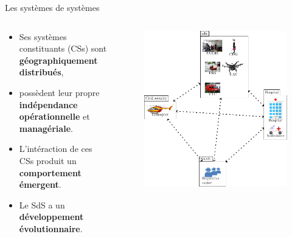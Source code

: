 

\begin{frame}{Les systèmes de systèmes}
\centering 
\begin{columns}
\begin{column}{0.4\textwidth}
\begin{block}{}
\begin{itemize}
\item  Ses systèmes constituants (CSs) sont \textbf{géographiquement
distribués}, 
\item possèdent leur propre \textbf{indépendance
opérationnelle} et
\textbf{managériale}. 
\item L'intéraction de ces CSs produit un \textbf{comportement
émergent}. 
\item Le SdS a un \textbf{développement évolutionnaire}.
\end{itemize} 
\end{block}
\end{column}
\begin{column}{0.5\textwidth}
\begin{figure}
\includegraphics[height=\textwidth]{imgs/fig_sos_overview.pdf}

\end{figure}
\end{column}
\end{columns}
\end{frame}
